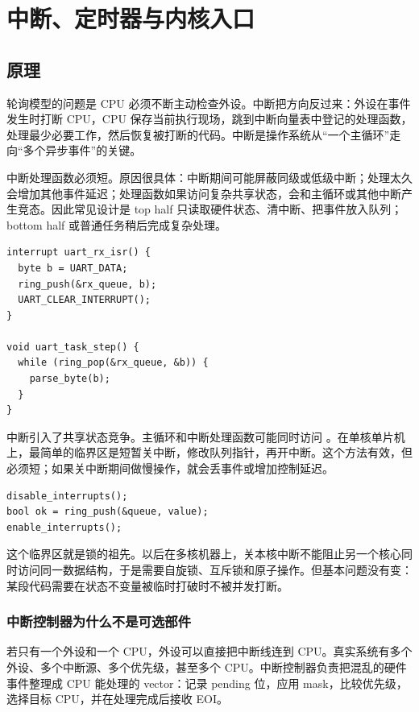 \chapter{中断、定时器与内核入口}

\section{原理}

轮询模型的问题是 CPU 必须不断主动检查外设。中断把方向反过来：外设在事件发生时打断 CPU，CPU 保存当前执行现场，跳到中断向量表中登记的处理函数，处理最少必要工作，然后恢复被打断的代码。中断是操作系统从“一个主循环”走向“多个异步事件”的关键。

中断处理函数必须短。原因很具体：中断期间可能屏蔽同级或低级中断；处理太久会增加其他事件延迟；处理函数如果访问复杂共享状态，会和主循环或其他中断产生竞态。因此常见设计是 top half 只读取硬件状态、清中断、把事件放入队列；bottom half 或普通任务稍后完成复杂处理。

\begin{lstlisting}
interrupt uart_rx_isr() {
  byte b = UART_DATA;
  ring_push(&rx_queue, b);
  UART_CLEAR_INTERRUPT();
}

void uart_task_step() {
  while (ring_pop(&rx_queue, &b)) {
    parse_byte(b);
  }
}
\end{lstlisting}

中断引入了共享状态竞争。主循环和中断处理函数可能同时访问 。在单核单片机上，最简单的临界区是短暂关中断，修改队列指针，再开中断。这个方法有效，但必须短；如果关中断期间做慢操作，就会丢事件或增加控制延迟。

\begin{lstlisting}
disable_interrupts();
bool ok = ring_push(&queue, value);
enable_interrupts();
\end{lstlisting}

这个临界区就是锁的祖先。以后在多核机器上，关本核中断不能阻止另一个核心同时访问同一数据结构，于是需要自旋锁、互斥锁和原子操作。但基本问题没有变：某段代码需要在状态不变量被临时打破时不被并发打断。

\subsection{中断控制器为什么不是可选部件}

若只有一个外设和一个 CPU，外设可以直接把中断线连到 CPU。真实系统有多个外设、多个中断源、多个优先级，甚至多个 CPU。中断控制器负责把混乱的硬件事件整理成 CPU 能处理的 vector：记录 pending 位，应用 mask，比较优先级，选择目标 CPU，并在处理完成后接收 EOI。

